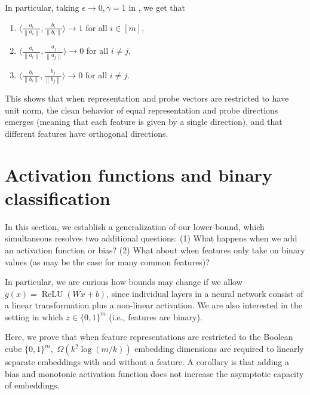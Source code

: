 \documentclass[11pt]{article}
\newcommand{\norm}[1]{\left\|#1\right\|}
\DeclareMathOperator{\ReLU}{ReLU}
\begin{document}
In particular, taking $\epsilon\rightarrow 0, \gamma = 1$ in , we get that
\begin{enumerate}
    \item[(i)] $\langle \frac{a_i}{\norm{a_i}}, \frac{b_i}{\norm{b_i}}\rangle \rightarrow 1$ for all $i\in [m],$
    \item[(ii)] $\langle \frac{a_i}{\norm{a_i}}, \frac{a_j}{\norm{a_j}}\rangle \rightarrow 0$ for all $i\neq j,$
    \item[(iii)] $\langle \frac{b_i}{\norm{b_i}}, \frac{b_j}{\norm{b_j}}\rangle \rightarrow 0$ for all $i\neq j.$
\end{enumerate}
This shows that when representation and probe vectors are restricted to have unit norm, the clean behavior of equal representation and probe directions emerges (meaning that each feature is given by a single direction), and that different features have orthogonal directions.

\section{Activation functions and binary classification}\label{sec:binary}
In this section, we establish a generalization of our lower bound, which simultaneous resolves two additional questions: (1) What happens when we add an activation function or bias? (2) What about when features only take on binary values (as may be the case for many common features)?

In particular, we are curious how bounds may change if we allow $g(x)=\ReLU(Wx+b)$, since individual layers in a neural network consist of a linear transformation plus a non-linear activation. We are also interested in the setting in which $z\in \{0,1\}^m$ (i.e., features are binary).

Here, we prove that when feature representations are restricted to the Boolean cube $\{0,1\}^m,$ $\Omega(k^2\log (m/k))$ embedding dimensions are required to linearly separate embeddings with and without a feature. A corollary is that adding a bias and monotonic activation function does not increase the asymptotic capacity of embeddings.
\end{document}
